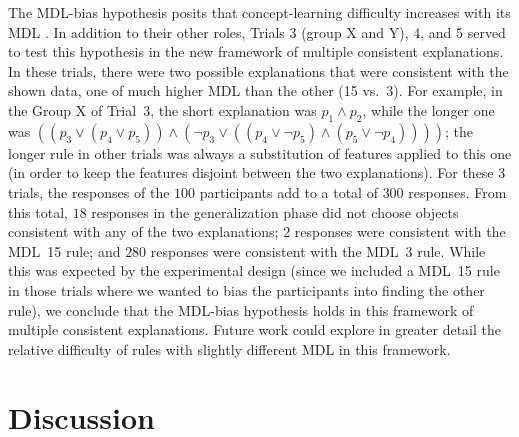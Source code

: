 The MDL-bias hypothesis posits that concept-learning difficulty increases with its MDL \cite{feldman2000minimization}. %
In addition to their other roles, Trials 3 (group X and Y), 4, and 5 served to test this hypothesis in the new framework of multiple consistent explanations. In these trials, there were two possible explanations that were consistent with the shown data, one of much higher MDL than the other (15 vs.\ 3). For example, in the Group X of Trial~3, the short explanation was $p_1 \land p_2$, while the longer one was $((p_3 \lor (p_4 \lor p_5))\land(\lnot p_3 \lor ((p_4 \lor \lnot p_5)\land (p_5 \lor \lnot p_4))))$; the longer rule in other trials was always a substitution of features applied to this one (in order to keep the features disjoint between the two explanations). For these 3 trials, the responses of the $100$ participants add to a total of $300$ responses. From this total, $18$ responses in the generalization phase did not choose objects consistent with any of the two explanations; $2$ responses were consistent with the MDL~15 rule; and $280$ responses were consistent with the MDL~3 rule. While this was expected by the experimental design (since we included a MDL~15 rule in those trials where we wanted to bias the participants into finding the other rule), we conclude that the MDL-bias hypothesis holds in this framework of multiple consistent explanations. Future work could explore in greater detail the relative difficulty of rules with slightly different MDL in this framework.





\section{Discussion}\label{sec:Discussion}


